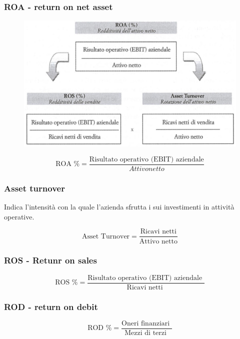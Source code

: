 \subsubsection{ROA - return on net asset}
\begin{figure}[H]
    \centering
    \includegraphics[width=0.7\linewidth]{2/img/ROA.png}
\end{figure}
\begin{equation*}
    \text{ROA \%} = \frac{\text{Risultato operativo (EBIT) aziendale}}{Attivo netto}
\end{equation*}

\subsubsection{Asset turnover}
Indica l'intensità con la quale l'azienda sfrutta i sui investimenti in attività operative.

\begin{equation*}
    \text{Asset Turnover} = \frac{\text{Ricavi netti}}{\text{Attivo netto}}
\end{equation*}

\subsubsection{ROS - Retunr on sales}
\begin{equation*}
    \text{ROS \%} = \frac{
        \text{
            Risultato operativo (EBIT) aziendale
        }
    }{
        \text{
            Ricavi netti
        }
    }
\end{equation*}

\subsubsection{ROD - return on debit}

\begin{equation*}
    \text{ROD \%} = \frac{
        \text{
            Oneri finanziari
        }
    }{
        \text{
            Mezzi di terzi
        }
    }
\end{equation*}

